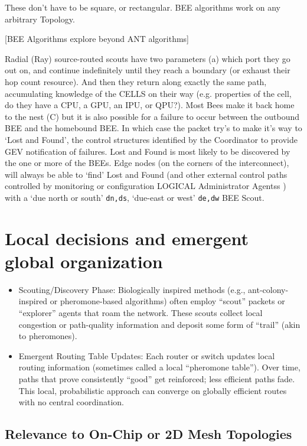 \documentclass[../../../OAE-SPEC-MAIN.tex]{subfiles}
\begin{document}
These don't have to be square, or rectangular. BEE algorithms work on any arbitrary Topology.

 [BEE Algorithms explore beyond ANT algorithms]

Radial (Ray) source-routed scouts have two parameters (a) which port they go out on, and continue indefinitely until they reach a boundary (or exhaust their hop count resource). And then they return along exactly the same path, accumulating knowledge of the CELLS on their way (e.g. properties of the cell, do they have a CPU, a GPU, an IPU, or QPU?).  Most Bees make it back home to the nest (C) but it is also possible for a failure to occur between the outbound BEE and the homebound BEE. In which case the packet try's to make it's way to `Lost and Found', the control structures identified by the Coordinator to provide GEV notification of failures.  Lost and Found is most likely to be discovered by the one or more of the BEEs. Edge nodes (on the corners of the interconnect), will always be able to `find' Lost and Found (and other external control paths controlled by monitoring or configuration LOGICAL Administrator Agentss ) with a `due north or south'  \texttt{dn,ds}, `due-east or west' \texttt{de,dw} BEE Scout. 




\section{Local decisions and emergent global organization}

\begin{itemize}
\item Scouting/Discovery Phase: Biologically inspired methods (e.g., ant-colony-inspired or pheromone-based algorithms) often employ “scout” packets or “explorer” agents that roam the network. These scouts collect local congestion or path-quality information and deposit some form of “trail” (akin to pheromones).
\item Emergent Routing Table Updates: Each router or switch updates local routing information (sometimes called a local “pheromone table”). Over time, paths that prove consistently ``good'' get reinforced; less efficient paths fade. This local, probabilistic approach can converge on globally efficient routes with no central coordination.
\end{itemize}

\subsection{Relevance to On-Chip or 2D Mesh Topologies}
\end{document}
